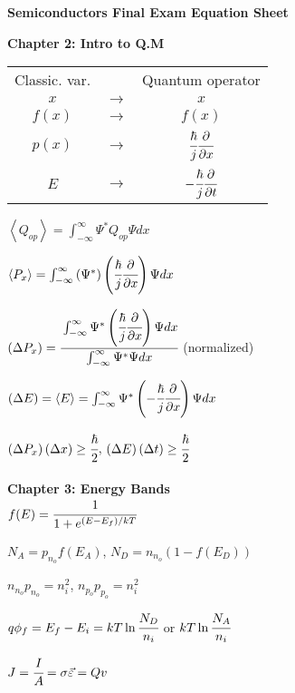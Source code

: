 \documentclass{article}
\newcommand{\sect}[1]{\noindent\textbf{#1}\\}
\newcommand\tab[1][1cm]{\hspace*{#1}}
\begin{document}
	\begin{small}\begin{center}\textbf{Semiconductors Final Exam Equation Sheet}\end{center}\end{small}
	{\fontsize{7pt}{8pt} \selectfont
	
	\begin{multicols*}{2}
		\sect{Chapter 2: Intro to Q.M}
		\begin{tabular}{ccc}
			Classic. var. && Quantum operator \\
			$x$ & $\rightarrow$ & $x$ \\
			$f(x)$ & $\rightarrow$ & $f(x)$ \\
			$p(x)$ & $\rightarrow$ & $\cfrac{\hbar}{j} \cfrac{\partial}{\partial x}$ \\
			$E$ & $\rightarrow$ & $-\cfrac{\hbar}{j} \cfrac{\partial}{\partial t}$ \\
		\end{tabular}
	
		\noindent $\left< Q_{op} \right> = \int_{-\infty}^\infty \Psi^* Q_{op} \Psi dx$
		
		\noindent $\left< P_x \right> = \int_{-\infty}^\infty \left(\Psi^*\right)\left(\cfrac{\hbar}{j}\cfrac{\partial}{\partial x}\right) \Psi dx$
		
		\noindent $\left(\Delta P_x\right) = \cfrac{\int_{-\infty}^\infty \Psi^* \left(\cfrac{\hbar}{j} \cfrac{\partial}{\partial x}\right) \Psi dx}{\int_{-\infty}^\infty \Psi^*\Psi dx}$ (normalized)
		
		\noindent $\left(\Delta  E\right) = \left<E\right> = \int_{-\infty}^\infty \Psi^*\left( -\cfrac{\hbar}{j} \cfrac{\partial}{\partial x} \right) \Psi dx$
		
		\noindent $\left(\Delta P_x\right)\left(\Delta x\right) \geq \cfrac{\hbar}{2}$, \tab[0.25cm] $\left(\Delta E\right)\left(\Delta t\right) \geq \cfrac{\hbar}{2}$\\\\
		
		\sect{Chapter 3: Energy Bands}
		$f(E) = \cfrac{1}{1 + e^{(E-E_f)/kT}}$
		
		\noindent $N_A=p_{n_o} f(E_A)$, $N_D = n_{n_o} (1 - f(E_D))$
		
		\noindent $n_{n_o} p_{n_o} = n_i^2$, $n_{p_o} p_{p_o} = n_i^2$
		
		\noindent $q\phi_f = E_f - E_i = kT\ln \cfrac{N_D}{n_i}$ or $kT\ln\cfrac{N_A}{n_i}$
		
		\noindent $J = \cfrac{I}{A} = \sigma \vec{\varepsilon} = Qv$
		

\end{multicols*}}
\end{document}
